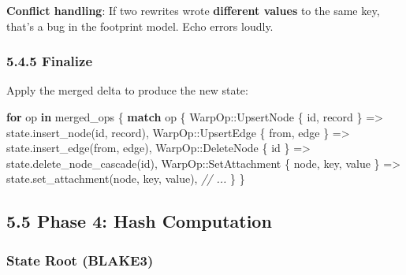 \documentclass[
]{book}
\newenvironment{Shaded}{}{}
\newcommand{\CommentTok}[1]{\textcolor[rgb]{0.38,0.63,0.69}{\textit{#1}}}
\newcommand{\ControlFlowTok}[1]{\textcolor[rgb]{0.00,0.44,0.13}{\textbf{#1}}}
\newcommand{\KeywordTok}[1]{\textcolor[rgb]{0.00,0.44,0.13}{\textbf{#1}}}
\newcommand{\NormalTok}[1]{#1}
\newcommand{\OperatorTok}[1]{\textcolor[rgb]{0.40,0.40,0.40}{#1}}
\newcommand{\PreprocessorTok}[1]{\textcolor[rgb]{0.74,0.48,0.00}{#1}}
\begin{document}
\textbf{Conflict handling}: If two rewrites wrote \textbf{different
values} to the same key, that's a bug in the footprint model. Echo
errors loudly.

\subsubsection{5.4.5 Finalize}\label{finalize}

Apply the merged delta to produce the new state:

\begin{Shaded}
\begin{Highlighting}[]
\ControlFlowTok{for}\NormalTok{ op }\KeywordTok{in}\NormalTok{ merged\_ops }\OperatorTok{\{}
    \ControlFlowTok{match}\NormalTok{ op }\OperatorTok{\{}
        \PreprocessorTok{WarpOp::}\NormalTok{UpsertNode }\OperatorTok{\{}\NormalTok{ id}\OperatorTok{,}\NormalTok{ record }\OperatorTok{\}} \OperatorTok{=\textgreater{}}\NormalTok{ state}\OperatorTok{.}\NormalTok{insert\_node(id}\OperatorTok{,}\NormalTok{ record)}\OperatorTok{,}
        \PreprocessorTok{WarpOp::}\NormalTok{UpsertEdge }\OperatorTok{\{}\NormalTok{ from}\OperatorTok{,}\NormalTok{ edge }\OperatorTok{\}} \OperatorTok{=\textgreater{}}\NormalTok{ state}\OperatorTok{.}\NormalTok{insert\_edge(from}\OperatorTok{,}\NormalTok{ edge)}\OperatorTok{,}
        \PreprocessorTok{WarpOp::}\NormalTok{DeleteNode }\OperatorTok{\{}\NormalTok{ id }\OperatorTok{\}} \OperatorTok{=\textgreater{}}\NormalTok{ state}\OperatorTok{.}\NormalTok{delete\_node\_cascade(id)}\OperatorTok{,}
        \PreprocessorTok{WarpOp::}\NormalTok{SetAttachment }\OperatorTok{\{}\NormalTok{ node}\OperatorTok{,}\NormalTok{ key}\OperatorTok{,}\NormalTok{ value }\OperatorTok{\}} \OperatorTok{=\textgreater{}}\NormalTok{ state}\OperatorTok{.}\NormalTok{set\_attachment(node}\OperatorTok{,}\NormalTok{ key}\OperatorTok{,}\NormalTok{ value)}\OperatorTok{,}
        \CommentTok{// ...}
    \OperatorTok{\}}
\OperatorTok{\}}
\end{Highlighting}
\end{Shaded}

\subsection{5.5 Phase 4: Hash
Computation}\label{phase-4-hash-computation}

\subsubsection{State Root (BLAKE3)}\label{state-root-blake3}
\end{document}
